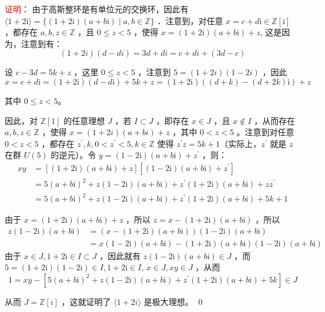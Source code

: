 \documentclass[UTF8, heading=true]{ctexart}
\begin{document}
\textcolor{red}{证明}： 由于高斯整环是有单位元的交换环，因此有 $\langle 1+2 \mathrm{i}\rangle=\{(1+2 \mathrm{i})(a+b \mathrm{i}) \mid a, b \in \mathbb{Z}\}$ ．注意到，对任意 $x=c+d \mathrm{i} \in \mathbb{Z}[\mathrm{i}]$ ，都存在 $a, b, z \in \mathbb{Z}$ ，且 $0 \leq z<5$ ，使得 $x=(1+2 \mathrm{i})(a+b \mathrm{i})+z$, 这是因为，注意到有：
$$
(1+2 i)(d-d i)=3 d+d i=c+d i+(3 d-c)
$$

设 $c-3 d=5 k+z$ ，这里 $0 \leq z<5$ ，注意到 $5=(1+2 i)(1-2 i)$ ，因此
$$
x=c+d \mathrm{i}=(1+2 \mathrm{i})(d-d \mathrm{i})+5 k+z=(1+2 \mathrm{i})((d+k)-(d+2 k) \mathrm{i})+z
$$

其中 $0 \leq z<5$。

因此，对 $\mathbb{Z}[1]$ 的任意理想 $J$ ，若 $I \subset J$ ，即存在 $x \in J$ ，且 $x \notin I$ ，从而存在 $a, b, z \in \mathbb{Z}$ ，使得 $x=(1+2 i)(a+b i)+z$ ，其中 $0<z<5$ 。注意到对任意 $0<z<5$ ，都存在 $z^{\prime}, k, 0<z^{\prime}<5, k \in \mathbb{Z}$ 使得 $z^{\prime} z=5 k+1$（实际上，$z^{\prime}$ 就是 $z$ 在群 $U(5)$ 的逆元）。令 $y=(1-2 \mathrm{i})(a+b \mathrm{i})+z^{\prime}$ ，则：
$$
\begin{aligned}
x y & =[(1+2 \mathrm{i})(a+b \mathrm{i})+z]\left[(1-2 \mathrm{i})(a+b \mathrm{i})+z^{\prime}\right] \\
& =5(a+b \mathrm{i})^2+z(1-2 \mathrm{i})(a+b \mathrm{i})+z^{\prime}(1+2 \mathrm{i})(a+b \mathrm{i})+z z^{\prime} \\
& =5(a+b \mathrm{i})^2+z(1-2 \mathrm{i})(a+b \mathrm{i})+z^{\prime}(1+2 \mathrm{i})(a+b \mathrm{i})+5 k+1
\end{aligned}
$$


由于 $x=(1+2 \mathrm{i})(a+b \mathrm{i})+z$ ，所以 $z=x-(1+2 \mathrm{i})(a+b \mathrm{i})$ ，所以
$$
\begin{aligned}
z(1-2 \mathrm{i})(a+b \mathrm{i}) & =(x-(1+2 \mathrm{i})(a+b \mathrm{i}))(1-2 \mathrm{i})(a+b \mathrm{i}) \\
& =x(1-2 \mathrm{i})(a+b \mathrm{i})-(1+2 \mathrm{i})(a+b \mathrm{i})(1-2 \mathrm{i})(a+b \mathrm{i})
\end{aligned}
$$
由于 $x \in J, 1+2 \mathrm{i} \in I \subset J$ ，因此就有 $z(1-2 \mathrm{i})(a+b \mathrm{i}) \in J$ ，而 $5=(1+2 \mathrm{i})(1-2 \mathrm{i}) \in I, 1+2 \mathrm{i} \in I$, $x \in J, x y \in J$ ，从而
$$
1=x y-\left[5(a+b \mathrm{i})^2+z(1-2 \mathrm{i})(a+b \mathrm{i})+z^{\prime}(1+2 \mathrm{i})(a+b \mathrm{i})+5 k\right] \in J
$$

从而 $J=\mathbb{Z}[i]$ ，这就证明了 $\langle 1+2 i\rangle$ 是极大理想。 \qed
\end{document}
